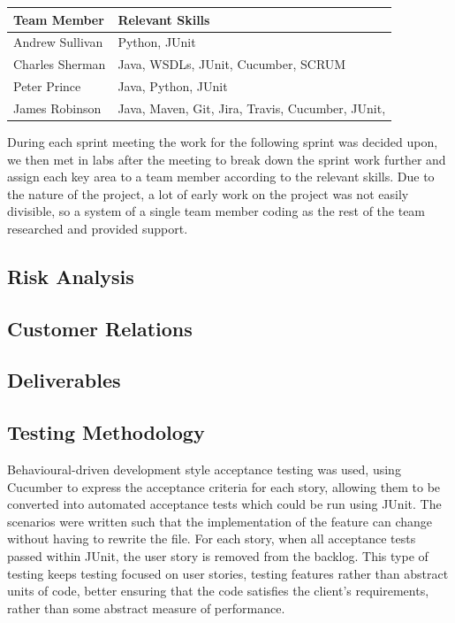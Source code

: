 \documentclass[a4paper, 12pt]{article}
\begin{document}
\begin{table}[h]
\begin{tabular}{|l|l|}
\hline
Team Member     & Relevant Skills                                  \\ \hline
Andrew Sullivan & Python, JUnit                                    \\ \hline
Charles Sherman & Java, WSDLs, JUnit, Cucumber, SCRUM              \\ \hline
Peter Prince    & Java, Python, JUnit                              \\ \hline
James Robinson  & Java, Maven, Git, Jira, Travis, Cucumber, JUnit, \\ \hline
\end{tabular}
\end{table}

During each sprint meeting the work for the following sprint was decided upon, we then met in labs after the meeting to break down the sprint work further and assign each key area to a team member according to the relevant skills. Due to the nature of the project, a lot of early work on the project was not easily divisible, so a system of a single team member coding as the rest of the team researched and provided support.

\subsection{Risk Analysis}

\subsection{Customer Relations}

\subsection{Deliverables}

\subsection{Testing Methodology}

Behavioural-driven development style acceptance testing was used, using Cucumber to express the acceptance criteria for each story, allowing them to be converted into automated acceptance tests which could be run using JUnit. The scenarios were written such that the implementation of the feature can change without having to rewrite the file. For each story, when all acceptance tests passed within JUnit, the user story is removed from the backlog. This type of testing keeps testing focused on user stories, testing features rather than abstract units of code, better ensuring that the code satisfies the client's requirements, rather than some abstract measure of performance. 
\end{document}
